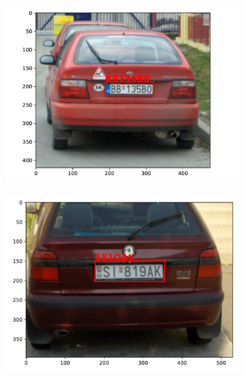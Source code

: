 \begin{figure}
    \centering
    \begin{subfigure}{0.31\textwidth}
        \includegraphics[width=\textwidth]{abbildungen/prediction_01.pdf}
    \end{subfigure}
    \begin{subfigure}{0.31\textwidth}
        \includegraphics[width=\textwidth]{abbildungen/prediction_02.pdf}
    \end{subfigure}
    \begin{subfigure}{0.31\textwidth}

\end{subfigure}
\end{figure}
